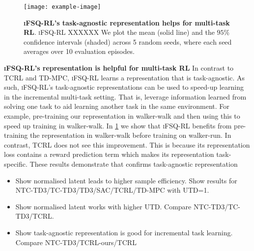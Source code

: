 \documentclass{article}
\theoremstyle{plain}
\theoremstyle{definition}
\theoremstyle{remark}
\newcommand{\our}{\textsc{iFSQ-RL}\xspace}
\begin{document}
\begin{figure}[ht]
\vskip 0.2in
\begin{center}
\centerline{\texttt{[image: example-image]}}
\caption{\textbf{\our's task-agnostic representation helps for multi-task RL}. \our XXXXXX We plot the mean (solid line) and the $95\%$ confidence intervals (shaded) across 5 random seeds, where each seed averages over 10 evaluation episodes.}
\label{fig:multi-task-pretraining}
\end{center}
\vskip -0.2in
\end{figure}

\textbf{\our's representation is helpful for multi-task RL}
In contrast to TCRL and TD-MPC, \our learns a representation that is task-agnostic.
As such, \our's task-agnostic representations can be used to speed-up learning in the incremental multi-task setting.
That is, leverage information learned from solving one task to aid learning another task in the same environment.
For example, pre-training our representation in walker-walk and then using this to speed up training in walker-walk.
In \cref{fig:multi-task-pretraining} we show that \our benefits from pre-training the representation in walker-walk
before training on walker-run.
In contrast, TCRL does not see this improvement.
This is because its representation loss contains a reward prediction term which makes its representation task-specific.
These results demonstrate that confirms task-agnostic representation



\begin{itemize}
    \item Show normalised latent leads to higher sample efficiency. Show results for NTC-TD3/TC-TD3/TD3/SAC/TCRL/TD-MPC with UTD=1.
    \item Show normalised latent works with higher UTD. Compare NTC-TD3/TC-TD3/TCRL.
    \item Show task-agnostic representation is good for incremental task learning. Compare NTC-TD3/TCRL-ours/TCRL
\end{itemize}
\end{document}
